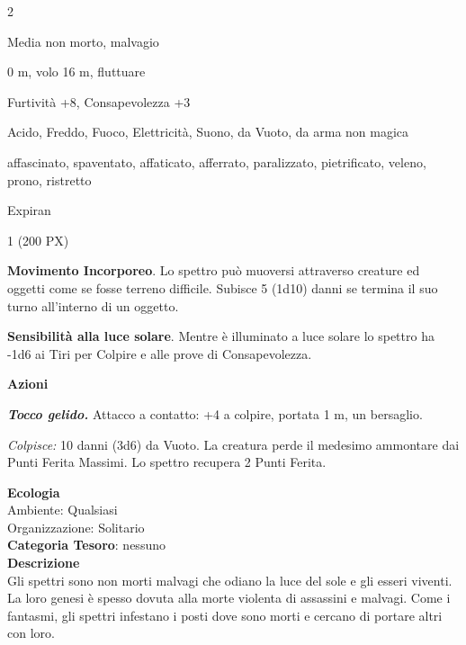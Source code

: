 \begin{multicols}{2}
{
\begin{description}[noitemsep, topsep=0pt, parsep=0pt, partopsep=0pt, itemsep=1pt, leftmargin=2.35cm,  labelwidth=2.2cm, itemindent=0cm, listparindent=0pt] %
\setlength{\baselineskip}{10pt}
\item[\textbf{Taglia/Tipo}] Media non morto, malvagio
\item[\textbf{Caratt.}] 
\item[\textbf{Punti Ferita}] 
\item[\textbf{Movimento}] 0 m, volo 16 m, fluttuare
\item[\textbf{Tiri Salvez.}] 
\item[\textbf{Comp.}] Furtività +8, Consapevolezza +3
\item[\textbf{Res. Danni}] Acido, Freddo, Fuoco, Elettricità, Suono, da Vuoto, da arma non magica
\item[\textbf{Immunità}] affascinato, spaventato, affaticato, afferrato, paralizzato, pietrificato, veleno, prono, ristretto
\item[\textbf{Sensi}] 
\item[\textbf{Lingue}] Expiran
\item[\textbf{Sfida}] 1 (200 PX)
\end{description}
\smallskip

\textbf{Movimento Incorporeo}. Lo spettro può muoversi attraverso creature ed oggetti come se fosse terreno difficile. Subisce 5 (1d10) danni se termina il suo turno all'interno di un oggetto.

\textbf{Sensibilità alla luce solare}. Mentre è illuminato a luce solare lo spettro ha -1d6 ai Tiri per Colpire e alle prove di Consapevolezza.

\textbf{Azioni}

\emph{\textbf{Tocco gelido.}} Attacco a contatto: +4 a colpire, portata 1 m, un bersaglio.

\emph{Colpisce:} 10 danni (3d6) da Vuoto. La creatura perde il medesimo ammontare dai Punti Ferita Massimi. Lo spettro recupera 2 Punti Ferita.

\textbf{Ecologia}\\
Ambiente: Qualsiasi\\
Organizzazione: Solitario\\
\textbf{Categoria Tesoro}: nessuno\\
\textbf{Descrizione}\\
Gli spettri sono non morti malvagi che odiano la luce del sole e gli esseri viventi. La loro genesi è spesso dovuta alla morte violenta di assassini e malvagi. Come i fantasmi, gli spettri infestano i posti dove sono morti e cercano di portare altri con loro.

}
\end{multicols}
